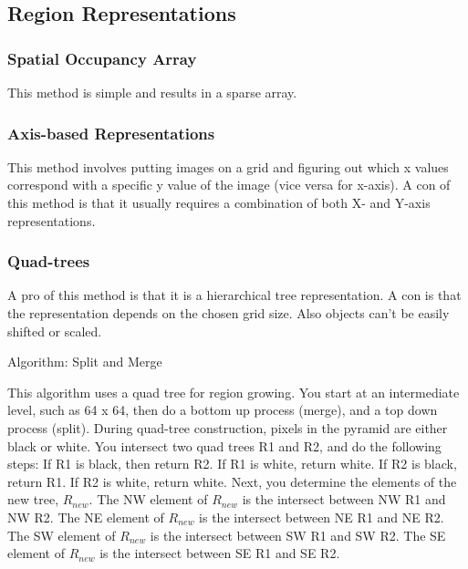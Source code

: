 \documentclass{article}
\begin{document}
\begin{multicols}{2}
 \subsection{Region Representations}
 \subsubsection{Spatial Occupancy Array}

  This method is simple and results in a sparse array.

 \subsubsection{Axis-based Representations}

  This method involves putting images on a grid and figuring out which x values correspond with a specific y value of the image (vice versa for x-axis).
  A con of this method is that it usually requires a combination of both X- and Y-axis representations.

 \subsubsection{Quad-trees}

  A pro of this method is that it is a hierarchical tree representation. A con is that the representation depends on the chosen grid size. Also objects can't be easily shifted or scaled.
  
  \vspace{5mm}

  Algorithm: Split and Merge

  \vspace{5mm}

  This algorithm uses a quad tree for region growing. You start at an intermediate level, such as 64 x 64, then do a bottom up process (merge), and a top down process (split).
  During quad-tree construction, pixels in the pyramid are either black or white.
  You intersect two quad trees R1 and R2, and do the following steps:
  If R1 is black, then return R2. If R1 is white, return white. If R2 is black, return R1. If R2 is white, return white.
  Next, you determine the elements of the new tree, $R_{new}$.
  The NW element of $R_{new}$ is the intersect between NW R1 and NW R2.
  The NE element of $R_{new}$ is the intersect between NE R1 and NE R2.
  The SW element of $R_{new}$ is the intersect between SW R1 and SW R2.
  The SE element of $R_{new}$ is the intersect between SE R1 and SE R2.


\end{multicols}
\end{document}
